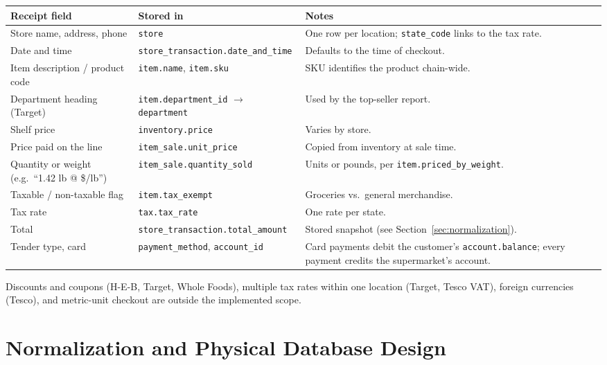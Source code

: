 \documentclass[11pt,letterpaper]{article}
\begin{document}
\begin{center}
\footnotesize
\begin{tabularx}{\textwidth}{@{}>{\raggedright\arraybackslash}p{}>{\raggedright\arraybackslash}p{}>{\raggedright\arraybackslash}X@{}}
\hline
Receipt field & Stored in & Notes \\ \hline
Store name, address, phone & \texttt{store} & One row per location; \texttt{state\_code} links to the tax rate. \\
Date and time & \texttt{store\_transaction.\allowbreak date\_and\_time} & Defaults to the time of checkout. \\
Item description / product code & \texttt{item.name}, \texttt{item.sku} & SKU identifies the product chain-wide. \\
Department heading (Target) & \texttt{item.department\_id} $\rightarrow$ \texttt{department} & Used by the top-seller report. \\
Shelf price & \texttt{inventory.price} & Varies by store. \\
Price paid on the line & \texttt{item\_sale.unit\_price} & Copied from inventory at sale time. \\
Quantity or weight (e.g.\ ``1.42 lb @ \$/lb'') & \texttt{item\_sale.quantity\_sold} & Units or pounds, per \texttt{item.priced\_by\_weight}. \\
Taxable / non-taxable flag & \texttt{item.tax\_exempt} & Groceries vs.\ general merchandise. \\
Tax rate & \texttt{tax.tax\_rate} & One rate per state. \\
Total & \texttt{store\_transaction.\allowbreak total\_amount} & Stored snapshot (see Section~\ref{sec:normalization}). \\
Tender type, card & \texttt{payment\_method}, \texttt{account\_id} & Card payments debit the customer's \texttt{account.balance}; every payment credits the supermarket's account. \\ \hline
\end{tabularx}
\end{center}

Discounts and coupons (H-E-B, Target, Whole Foods), multiple tax rates within one location (Target, Tesco VAT), foreign currencies (Tesco), and metric-unit checkout are outside the implemented scope.

\section{Normalization and Physical Database Design}
\end{document}
